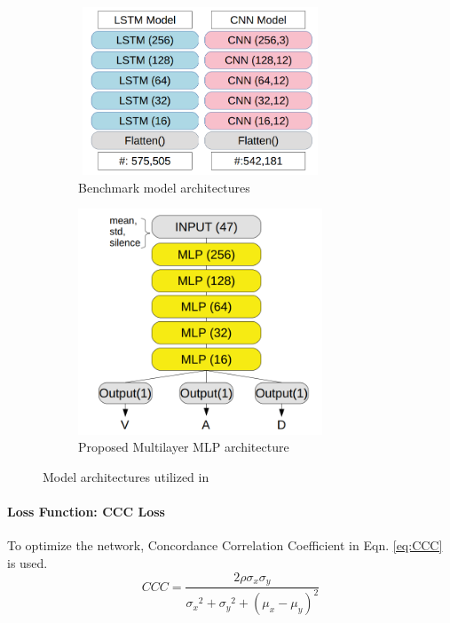 \documentclass[a4paper,11pt]{article}
\begin{document}
\begin{figure}[h]
\centering
\begin{subfigure}[b]{0.45\textwidth}
\centering
\includegraphics[width=0.8\textwidth, height=5cm]{modelsparams.png}
\caption{Benchmark model architectures}\label{subfig:subcnnlstm}
\end{subfigure}
\begin{subfigure}[b]{0.45\linewidth}
\centering
\includegraphics[width=0.8\textwidth]{modelparamsmlp.png}
\caption{Proposed Multilayer MLP architecture}\label{subfig:submlp}
\end{subfigure}
\caption{Model architectures utilized in \cite{atmaja2020deep}}
\label{fig:models}
\end{figure}

\paragraph{Loss Function: CCC Loss}

To optimize the network, Concordance Correlation Coefficient in Eqn. \ref{eq:CCC} is used. 
\begin{equation}
    CCC = \frac{2\rho{\sigma_x}{\sigma_y}}{{\sigma_x}^2 + {\sigma_y}^2 + (\mu_x - \mu_y)^2}
    \label{eq:CCC}
\end{equation}
\end{document}
